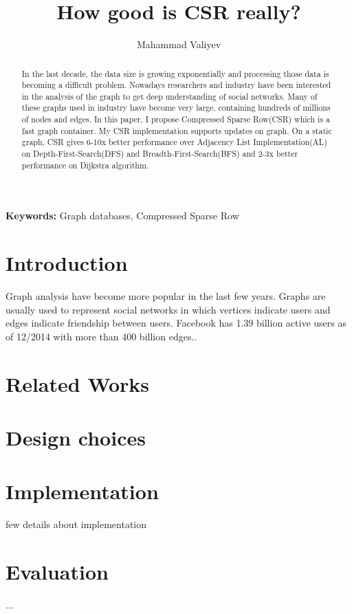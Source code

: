 \documentclass{article}
\title{How good is CSR really?}
\author{Mahammad Valiyev}
\begin{document}
\maketitle

\begin{abstract}
  In the last decade, the data size is growing exponentially and processing those data is becoming a difficult problem. Nowadays researchers and industry have been interested in the analysis of the graph to get deep understanding of social networks. Many of these graphs used in industry have become very large, containing hundreds of millions of nodes and edges. In this paper, I propose Compressed Sparse Row(CSR) which is a fast graph container. My CSR implementation supports updates on graph. On a static graph, CSR gives 6-10x better performance over Adjacency List Implementation(AL) on Depth-First-Search(DFS) and Breadth-First-Search(BFS) and 2-3x better performance on Dijkstra algorithm.
\end{abstract}
\textbf{Keywords:} Graph databases, Compressed Sparse Row

\section{Introduction}
\label{introduction}
Graph analysis have become more popular in the last few years. Graphs are usually used to represent social networks in which vertices indicate users and edges indicate friendship between users. Facebook has 1.39 billion  active users as of 12/2014 with more than 400 billion edges.\cite{fb}.





\section{Related Works}

\section{Design choices}
\label{design}

\section{Implementation}
 few details about implementation



\section{Evaluation}
...
\end{document}

